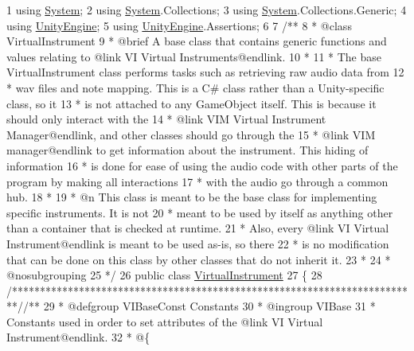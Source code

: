 \begin{DoxyCodeInclude}
1 \textcolor{keyword}{using} \hyperlink{namespace_system}{System};
2 \textcolor{keyword}{using} \hyperlink{namespace_system}{System}.Collections;
3 \textcolor{keyword}{using} \hyperlink{namespace_system}{System}.Collections.Generic;
4 \textcolor{keyword}{using} \hyperlink{namespace_unity_engine}{UnityEngine};
5 \textcolor{keyword}{using} \hyperlink{namespace_unity_engine}{UnityEngine}.Assertions;
6 \textcolor{comment}{}
7 \textcolor{comment}{/**}
8 \textcolor{comment}{ * @class VirtualInstrument}
9 \textcolor{comment}{ * @brief A base class that contains generic functions and values relating to @link VI Virtual
       Instruments@endlink.}
10 \textcolor{comment}{ * }
11 \textcolor{comment}{ * The base VirtualInstrument class performs tasks such as retrieving raw audio data from }
12 \textcolor{comment}{ * wav files and note mapping. This is a C# class rather than a Unity-specific class, so it}
13 \textcolor{comment}{ * is not attached to any GameObject itself. This is because it should only interact with the}
14 \textcolor{comment}{ * @link VIM Virtual Instrument Manager@endlink, and other classes should go through the }
15 \textcolor{comment}{ * @link VIM manager@endlink to get information about the instrument. This hiding of information}
16 \textcolor{comment}{ * is done for ease of using the audio code with other parts of the program by making all interactions}
17 \textcolor{comment}{ * with the audio go through a common hub.}
18 \textcolor{comment}{ * }
19 \textcolor{comment}{ * @n This class is meant to be the base class for implementing specific instruments. It is not}
20 \textcolor{comment}{ * meant to be used by itself as anything other than a container that is checked at runtime.}
21 \textcolor{comment}{ * Also, every @link VI Virtual Instrument@endlink is meant to be used as-is, so there }
22 \textcolor{comment}{ * is no modification that can be done on this class by other classes that do not inherit it.}
23 \textcolor{comment}{ * }
24 \textcolor{comment}{ * @nosubgrouping}
25 \textcolor{comment}{ */}
26 \textcolor{keyword}{public} \textcolor{keyword}{class }\hyperlink{class_virtual_instrument}{VirtualInstrument}
27 \{
28     \textcolor{comment}{/*************************************************************************/}\textcolor{comment}{/** }
29 \textcolor{comment}{     * @defgroup VIBaseConst Constants}
30 \textcolor{comment}{     * @ingroup VIBase}
31 \textcolor{comment}{     * Constants used in order to set attributes of the @link VI Virtual Instrument@endlink.}
32 \textcolor{comment}{     * @\{}

\end{DoxyCodeInclude}
